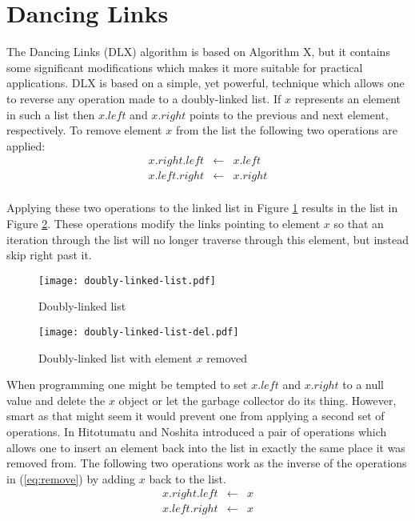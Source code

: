 \section{Dancing Links}
\label{dlx}

The Dancing Links (DLX) algorithm is based on Algorithm X, but it contains some significant modifications which makes it more suitable for practical applications.
DLX is based on a simple, yet powerful, technique which allows one to reverse any operation made to a doubly-linked list.
If $x$ represents an element in such a list then $x.left$ and $x.right$ points to the previous and next element, respectively.
To remove element $x$ from the list the following two operations are applied:
\begin{equation}
	\label{eq:remove}
	\begin{array}{rcl}
		x.right.left &\leftarrow& x.left \\
		x.left.right &\leftarrow& x.right \\
	\end{array}
\end{equation}

Applying these two operations to the linked list in Figure \ref{fig:linked} results in the list in Figure \ref{fig:linked_del}.
These operations modify the links pointing to element $x$ so that an iteration through the list will no longer traverse through this element, but instead skip right past it.
\begin{figure}[H]
	\centering 
	\texttt{[image: doubly-linked-list.pdf]}
	\caption{Doubly-linked list}
	\label{fig:linked}
\end{figure}
\begin{figure}[H]
	\centering 
	\texttt{[image: doubly-linked-list-del.pdf]}
	\caption{Doubly-linked list with element $x$ removed}
	\label{fig:linked_del}
\end{figure}

When programming one might be tempted to set $x.left$ and $x.right$ to a null value and delete the $x$ object or let the garbage collector do its thing.
However, smart as that might seem it would prevent one from applying a second set of operations.
In \cite{Hitotumatu79} Hitotumatu and Noshita introduced a pair of operations which allows one to insert an element back into the list in exactly the same place it was removed from.
The following two operations work as the inverse of the operations in (\ref{eq:remove}) by adding $x$ back to the list.
\begin{equation}
	\label{eq:add}
	\begin{array}{rcl}
		x.right.left &\leftarrow& x \\
		x.left.right &\leftarrow& x \\
	\end{array}
\end{equation}

